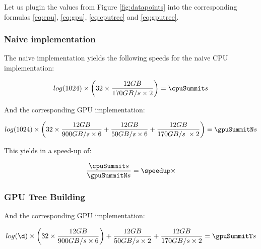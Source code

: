 \documentclass[]{article}
\begin{document}
Let us plugin the values from Figure \ref{fig:datapoints} into the corresponding formulas \ref{eq:cpu}, \ref{eq:gpu}, \ref{eq:cputree} and \ref{eq:gputree}.

\subsubsection{Naive implementation}
The naive implementation yields the following speeds for the naive CPU  implementation:

\pgfmathsetmacro{}
\begin{center}
	\begin{equation}
		log(1024) \times \left ( \p \times \frac{ \s GB }{170 GB/s \times 2} \right ) = \cpuSummit s
	\end{equation}
\end{center}

And the corresponding GPU implementation:
\pgfmathsetmacro{}
\begin{center}
	\begin{equation}
		log(1024) \times \left ( \p \times \frac{\s GB}{900 GB/s \times 6} + \frac{\s GB}{50 GB/s \times 6}  + \frac{\s GB}{170 GB/s \ \times 2} \right )= \gpuSummitN s
	\end{equation}
\end{center}

This yields in a speed-up of:
\pgfmathsetmacro\speedup{\cpuSummit / \gpuSummitN}
\begin{center}
	\begin{equation}
		\frac{\cpuSummit s}{\gpuSummitN s} = \speedup \times 
	\end{equation}
\end{center}


\subsubsection{GPU Tree Building}

And the corresponding GPU implementation:
\pgfmathsetmacro{}
 
\begin{center}
	\begin{equation}
		log(\d) \times \left ( \p \times \frac{\s GB}{900 GB/s \times 6} \right ) + \frac{\s GB}{50 GB/s \times 2}  + \frac{\s GB}{170 GB/s \times 2} = \gpuSummitT s
	\end{equation}
\end{center}
\end{document}
